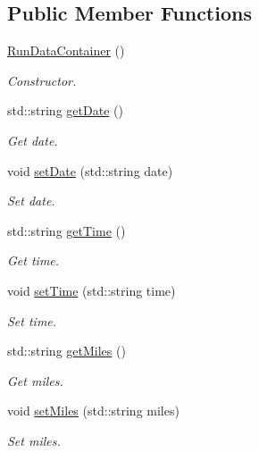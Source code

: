 \subsection*{Public Member Functions}
\begin{DoxyCompactItemize}
\item 
\mbox{\hyperlink{classRunDataContainer_ad567340214b5aad21b160d198d7d8e18}{Run\+Data\+Container}} ()
\begin{DoxyCompactList}\small\item\em Constructor. \end{DoxyCompactList}\item 
std\+::string \mbox{\hyperlink{classRunDataContainer_a73c931d83657e6ec55599e4bf81cf6dc}{get\+Date}} ()
\begin{DoxyCompactList}\small\item\em Get date. \end{DoxyCompactList}\item 
void \mbox{\hyperlink{classRunDataContainer_a15faf13321d882722b0161265da14b3e}{set\+Date}} (std\+::string date)
\begin{DoxyCompactList}\small\item\em Set date. \end{DoxyCompactList}\item 
std\+::string \mbox{\hyperlink{classRunDataContainer_ae3547727f15fe908ccd0427d0d0fc5c1}{get\+Time}} ()
\begin{DoxyCompactList}\small\item\em Get time. \end{DoxyCompactList}\item 
void \mbox{\hyperlink{classRunDataContainer_a4058969b76c364e84ab19d85b9bb3df4}{set\+Time}} (std\+::string time)
\begin{DoxyCompactList}\small\item\em Set time. \end{DoxyCompactList}\item 
std\+::string \mbox{\hyperlink{classRunDataContainer_ab280bd5e01b63064e59665057fd11bd7}{get\+Miles}} ()
\begin{DoxyCompactList}\small\item\em Get miles. \end{DoxyCompactList}\item 
void \mbox{\hyperlink{classRunDataContainer_a5422f9dbba64149560f94b9d4eaba524}{set\+Miles}} (std\+::string miles)
\begin{DoxyCompactList}\small\item\em Set miles. \end{DoxyCompactList}\item 

\end{DoxyCompactItemize}
